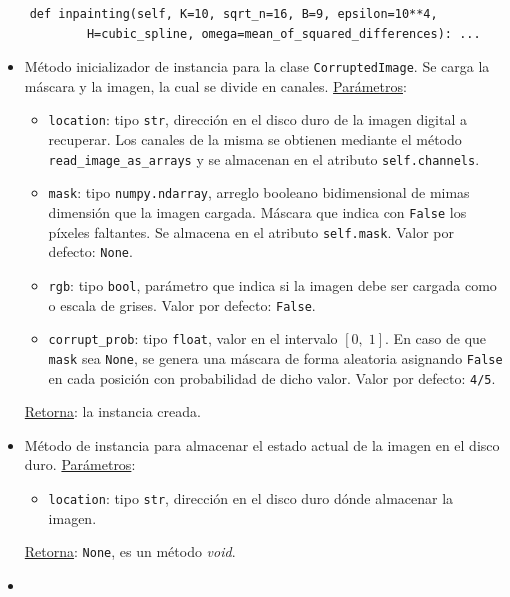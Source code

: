 \begin{enumerate}
\begin{lstlisting}
	def inpainting(self, K=10, sqrt_n=16, B=9, epsilon=10**4,
			H=cubic_spline, omega=mean_of_squared_differences): ...
	\end{lstlisting}
	\begin{itemize}
		\item {}
		
		M\'etodo inicializador de instancia para la clase \texttt{CorruptedImage}. Se carga la m\'ascara y la imagen, la cual se divide en canales. \underline{Par\'ametros}:
		\begin{itemize}
			\item \texttt{location}: tipo \texttt{str}, direcci\'on en el disco duro de la imagen digital a recuperar. Los canales de la misma se obtienen mediante el m\'etodo \texttt{read\_image\_as\_arrays} y se almacenan en el atributo \texttt{self.channels}.
			\item \texttt{mask}: tipo \texttt{numpy.ndarray}, arreglo booleano bidimensional de mimas dimensi\'on que la imagen cargada. M\'ascara que indica con \texttt{False} los p\'ixeles faltantes. Se almacena en el atributo \texttt{self.mask}. Valor por defecto: \texttt{None}.
			\item \texttt{rgb}: tipo \texttt{bool}, par\'ametro que indica si la imagen debe ser cargada como \RGB o escala de grises. Valor por defecto: \texttt{False}.
			\item \texttt{corrupt\_prob}: tipo \texttt{float}, valor en el intervalo $[0,\; 1]$. En caso de que \texttt{mask} sea \texttt{None}, se genera una m\'ascara de forma aleatoria asignando \texttt{False} en cada posici\'on con probabilidad de dicho valor. Valor por defecto: \texttt{4/5}. 
		\end{itemize}
		\underline{Retorna}: la instancia creada.
		
		\item {}
		
		M\'etodo de instancia para almacenar el estado actual de la imagen en el disco duro. \underline{Par\'ametros}:
		\begin{itemize}
			\item \texttt{location}: tipo \texttt{str}, direcci\'on en el disco duro d\'onde almacenar la imagen. 
		\end{itemize}
		\underline{Retorna}: \texttt{None}, es un m\'etodo \textit{void}.
		
		\item {}
		

\end{itemize}
\end{enumerate}
